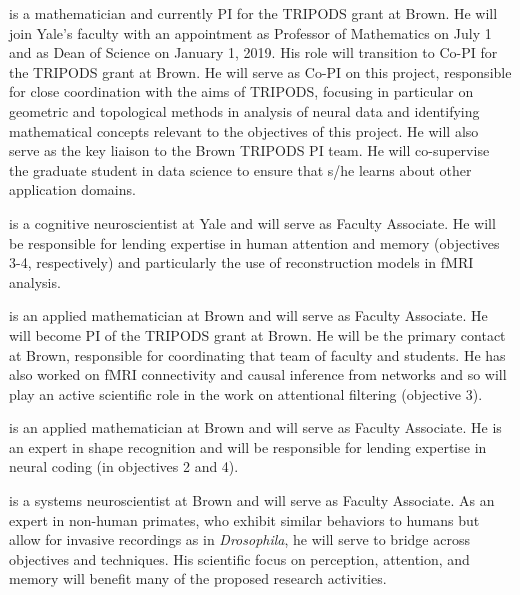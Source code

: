  is a mathematician and currently PI for the
TRIPODS grant at Brown. He will join Yale's faculty with an appointment as Professor of Mathematics on July 1 and as Dean
of Science on January 1, 2019. His role will transition to Co-PI for the TRIPODS
grant at Brown. He will serve as Co-PI on this project, responsible for
close coordination with the aims of TRIPODS, focusing in particular on geometric and topological methods in analysis of neural data and identifying mathematical
concepts relevant to the objectives of this project. He will also serve as the key liaison to the Brown
TRIPODS PI team. He will co-supervise the graduate student in data
science to ensure that s/he learns about other application domains.

 is a cognitive neuroscientist at Yale and will serve as
Faculty Associate. He will be responsible for lending expertise in
human attention and memory (objectives 3-4, respectively) and
particularly the use of reconstruction models in fMRI analysis.

 is an applied mathematician at Brown and will serve as
Faculty Associate. He will become PI of the TRIPODS grant at Brown. He will
be the primary contact at Brown, responsible for coordinating that
team of faculty and students. He has also worked on fMRI connectivity
and causal inference from networks and so will play an active
scientific role in the work on attentional filtering (objective 3).

 is an applied mathematician at Brown and will serve as
Faculty Associate. He is an expert in shape recognition and will be responsible for lending expertise in neural coding (in objectives 2 and 4).

 is a systems neuroscientist at Brown and will serve as
Faculty Associate. As an expert in non-human primates, who exhibit
similar behaviors to humans but allow for invasive recordings as in
{\it Drosophila}, he will serve to bridge across objectives and
techniques. His scientific focus on perception, attention, and memory
will benefit many of the proposed research activities.

